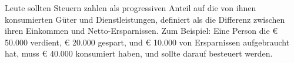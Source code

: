 Leute sollten Steuern zahlen als progressiven Anteil auf die von ihnen konsumierten Güter und Dienstleistungen, definiert als die Differenz zwischen ihren Einkommen und Netto-Ersparnissen.
Zum Beispiel: Eine Person die € 50.000 verdient, € 20.000 gespart, und € 10.000 von Ersparnissen aufgebraucht hat, muss € 40.000 konsumiert haben, und sollte darauf besteuert werden.